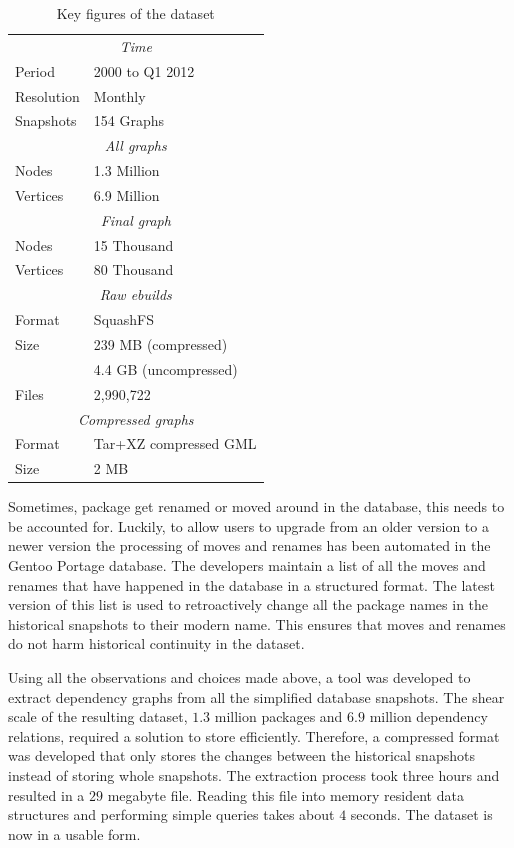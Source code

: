\documentclass[smallextended,final]{svjour3}
\begin{document}
\begin{table}
\vspace{-1em}
\small\centering
\caption{Key figures of the dataset}\label{tbl:dataset}
\begin{tabular}{ll}
\toprule
\multicolumn{2}{c}{\emph{Time}} \\[0.5mm]
Period & 2000 to Q1 2012 \\
Resolution & Monthly \\
Snapshots & 154 Graphs \\
\midrule
\multicolumn{2}{c}{\emph{All graphs}} \\[0.5mm]
Nodes & 1.3 Million \\
Vertices & 6.9 Million \\
\midrule
\multicolumn{2}{c}{\emph{Final graph}} \\[0.5mm]
Nodes & 15 Thousand \\
Vertices & 80 Thousand \\
\midrule
\multicolumn{2}{c}{\emph{Raw ebuilds}} \\[0.5mm]
Format & SquashFS \\
Size & 239 MB (compressed) \\
 & 4.4 GB (uncompressed) \\
Files & 2,990,722 \\
\midrule
\multicolumn{2}{c}{\emph{Compressed graphs}} \\[0.5mm]
Format & Tar+XZ compressed GML \\
Size & 2 MB \\
\bottomrule
\end{tabular}
\vspace{-1em}
\end{table}

Sometimes, package get renamed or moved around in the database, this needs to be accounted for. Luckily, to allow users to upgrade from an older version to a newer version the processing of moves and renames has been automated in the Gentoo Portage database. The developers maintain a list of all the moves and renames that have happened in the database in a structured format. The latest version of this list is used to retroactively change all the package names in the historical snapshots to their modern name. This ensures that moves and renames do not harm historical continuity in the dataset.

Using all the observations and choices made above, a tool was developed to extract dependency graphs from all the simplified database snapshots. The shear scale of the resulting dataset, $1.3$ million packages and $6.9$ million dependency relations, required a solution to store efficiently. Therefore, a compressed format was developed that only stores the changes between the historical snapshots instead of storing whole snapshots. The extraction process took three hours and resulted in a $29$ megabyte file. Reading this file into memory resident data structures and performing simple queries takes about $4$ seconds. The dataset is now in a usable form.
\end{document}
